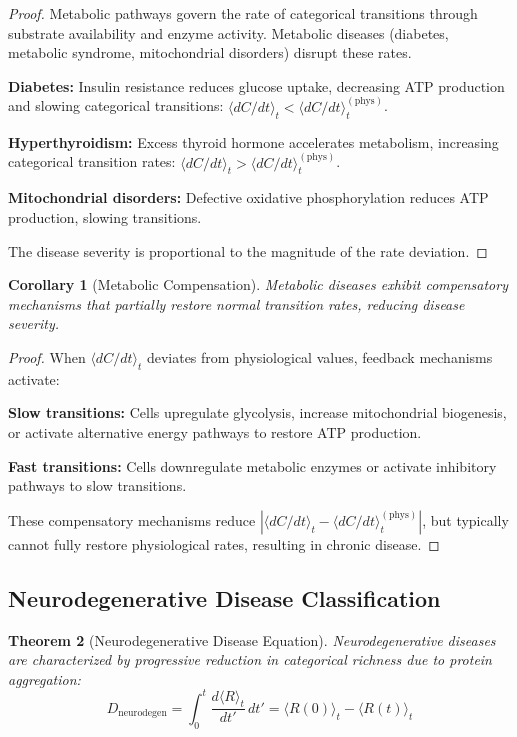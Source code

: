 \documentclass[11pt,twocolumn,a4paper]{article}
\newtheorem{theorem}{Theorem}[section]
\newtheorem{corollary}[theorem]{Corollary}
\theoremstyle{definition}
\theoremstyle{remark}
\begin{document}
\begin{proof}
Metabolic pathways govern the rate of categorical transitions through substrate availability and enzyme activity. Metabolic diseases (diabetes, metabolic syndrome, mitochondrial disorders) disrupt these rates.

\textbf{Diabetes:} Insulin resistance reduces glucose uptake, decreasing ATP production and slowing categorical transitions: $\langle dC/dt \rangle_t < \langle dC/dt \rangle_t^{\mathrm{(phys)}}$.

\textbf{Hyperthyroidism:} Excess thyroid hormone accelerates metabolism, increasing categorical transition rates: $\langle dC/dt \rangle_t > \langle dC/dt \rangle_t^{\mathrm{(phys)}}$.

\textbf{Mitochondrial disorders:} Defective oxidative phosphorylation reduces ATP production, slowing transitions.

The disease severity is proportional to the magnitude of the rate deviation.
\end{proof}

\begin{corollary}[Metabolic Compensation]
\label{cor:metabolic_compensation}
Metabolic diseases exhibit compensatory mechanisms that partially restore normal transition rates, reducing disease severity.
\end{corollary}

\begin{proof}
When $\langle dC/dt \rangle_t$ deviates from physiological values, feedback mechanisms activate:

\textbf{Slow transitions:} Cells upregulate glycolysis, increase mitochondrial biogenesis, or activate alternative energy pathways to restore ATP production.

\textbf{Fast transitions:} Cells downregulate metabolic enzymes or activate inhibitory pathways to slow transitions.

These compensatory mechanisms reduce $|\langle dC/dt \rangle_t - \langle dC/dt \rangle_t^{\mathrm{(phys)}}|$, but typically cannot fully restore physiological rates, resulting in chronic disease.
\end{proof}

\subsection{Neurodegenerative Disease Classification}

\begin{theorem}[Neurodegenerative Disease Equation]
\label{thm:neurodegenerative_disease}
Neurodegenerative diseases are characterized by progressive reduction in categorical richness due to protein aggregation:
\begin{equation}
D_{\mathrm{neurodegen}} = \int_0^t \frac{d\langle R \rangle_t}{dt'} \, dt' = \langle R(0) \rangle_t - \langle R(t) \rangle_t
\label{eq:neurodegenerative_disease}
\end{equation}
\end{theorem}
\end{document}
